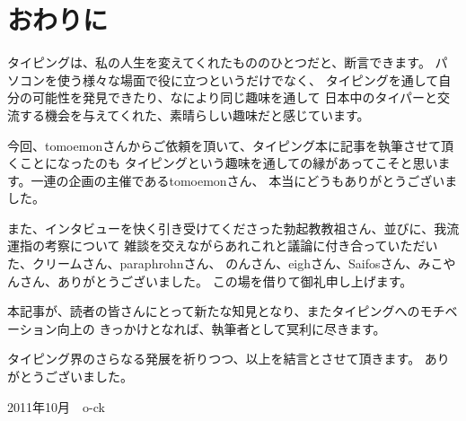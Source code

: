 \section{おわりに}

タイピングは、私の人生を変えてくれたもののひとつだと、断言できます。
パソコンを使う様々な場面で役に立つというだけでなく、
タイピングを通して自分の可能性を発見できたり、なにより同じ趣味を通して
日本中のタイパーと交流する機会を与えてくれた、素晴らしい趣味だと感じています。


今回、tomoemonさんからご依頼を頂いて、タイピング本に記事を執筆させて頂くことになったのも
タイピングという趣味を通しての縁があってこそと思います。一連の企画の主催であるtomoemonさん、
本当にどうもありがとうございました。

また、インタビューを快く引き受けてくださった勃起教教祖さん、並びに、我流運指の考察について
雑談を交えながらあれこれと議論に付き合っていただいた、クリームさん、paraphrohnさん、
のんさん、eighさん、Saifosさん、みこやんさん、ありがとうございました。
この場を借りて御礼申し上げます。


本記事が、読者の皆さんにとって新たな知見となり、またタイピングへのモチベーション向上の
きっかけとなれば、執筆者として冥利に尽きます。

タイピング界のさらなる発展を祈りつつ、以上を結言とさせて頂きます。
ありがとうございました。

2011年10月　o-ck
